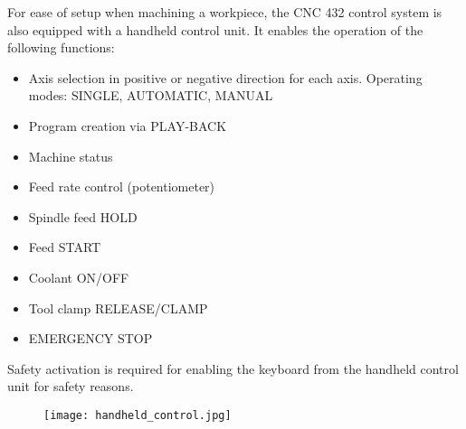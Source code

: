 
\setcounter{page}{4}


\noindent
For ease of setup when machining a workpiece, the CNC 432 control system is also equipped with a handheld control unit. It enables the operation of the following functions:

\begin{itemize}[itemsep=1pt,parsep=0pt]
    \item Axis selection in positive or negative direction for each axis. Operating modes: SINGLE, AUTOMATIC, MANUAL
    \item Program creation via PLAY-BACK
    \item Machine status
    \item Feed rate control (potentiometer)
    \item Spindle feed HOLD
    \item Feed START
    \item Coolant ON/OFF
    \item Tool clamp RELEASE/CLAMP
    \item EMERGENCY STOP
\end{itemize}

\noindent
Safety activation is required for enabling the keyboard from the handheld control unit for safety reasons.

\vspace{0.3cm}


\vspace{0.3cm}


\vspace{-0.6cm}

\begin{center}
\end{center}

\vspace{-0.5cm}

\begin{figure}[h]
    \centering
    \texttt{[image: handheld\_control.jpg]}
\end{figure}

